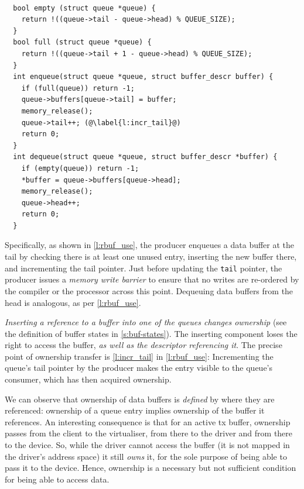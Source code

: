\documentclass[a4paper,12pt]{report}
\newcommand{\code}[1]{\texttt{#1}}
\begin{document}
\begin{lstlisting}[gobble=2,firstline=2,float=th,tabsize=2,
  label={l:rbuf_use},
  caption={Control-region queue management. }]

  bool empty (struct queue *queue) {
    return !((queue->tail - queue->head) % QUEUE_SIZE);
  }
  bool full (struct queue *queue) {
    return !((queue->tail + 1 - queue->head) % QUEUE_SIZE);
  }
  int enqueue(struct queue *queue, struct buffer_descr buffer) {
    if (full(queue)) return -1;
    queue->buffers[queue->tail] = buffer;
    memory_release();
    queue->tail++; (@\label{l:incr_tail}@)
    return 0;
  }
  int dequeue(struct queue *queue, struct buffer_descr *buffer) {
    if (empty(queue)) return -1;
    *buffer = queue->buffers[queue->head];
    memory_release();
    queue->head++;
    return 0;
  }
\end{lstlisting}

Specifically, as shown in \autoref{l:rbuf_use}, the producer enqueues
a data buffer at the tail by checking there is at least one unused entry,
inserting the new buffer there, and incrementing the tail pointer. Just before
updating the \code{tail} pointer, the producer issues a \emph{memory
  write barrier} to ensure that no writes are re-ordered by the compiler
or the processor across this point.
Dequeuing data buffers from the head is analogous, as per \autoref{l:rbuf_use}.

\emph{Inserting a reference to a buffer into one of the queues changes ownership} (see the
definition of buffer states in \autoref{s:buf-states}). The inserting
component loses the right to access the buffer, \emph{as well as the
descriptor referencing it}. The precise point of
ownership transfer is \autoref{l:incr_tail} in \autoref {l:rbuf_use}:
Incrementing the queue's tail pointer by the producer makes the entry
visible to the queue's consumer, which has then acquired ownership.

We can observe that ownership of data buffers is \emph{defined} by
where they are referenced: ownership of a queue entry implies
ownership of the buffer it references. An interesting consequence is
that for an active \gls{tx} buffer, ownership passes from the client to the
virtualiser, from there to the driver and from there to the
device. So, while the driver cannot access the buffer (it is not
mapped in the driver's address space) it still \emph{owns} it, for the
sole purpose of being able to pass it to the device. Hence, ownership
is a necessary but not sufficient condition for being able to access
data.
\end{document}
